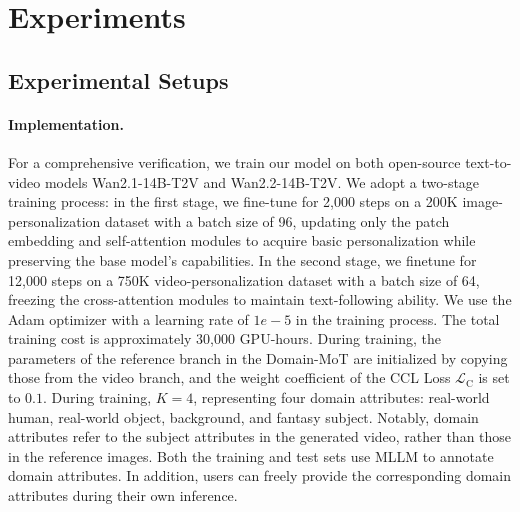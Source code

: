 \section{Experiments}


\subsection{Experimental Setups}
\paragraph{\textbf{Implementation.}}  For a comprehensive verification, we train our model on both open-source text-to-video models Wan2.1-14B-T2V \cite{wan2025wan} and Wan2.2-14B-T2V. We adopt a two-stage training process: in the first stage, we fine-tune for 2,000 steps on a 200K image-personalization dataset with a batch size of 96, updating only the patch embedding and self-attention modules to acquire basic personalization while preserving the base model’s capabilities. In the second stage, we finetune for 12,000 steps on a 750K video-personalization dataset with a batch size of 64, freezing the cross-attention modules to maintain text-following ability.  We use the Adam optimizer with a learning rate of $1e-5$ in the training process. The total training cost is approximately 30,000 GPU-hours. During training, the parameters of the reference branch in the Domain-MoT are initialized by copying those from the video branch, and the weight coefficient of the CCL Loss $\mathcal{L}_{\mathrm{C}}$ is set to $0.1$. During training, $K=4$, representing four domain attributes: real-world human, real-world object, background, and fantasy subject. Notably, domain attributes refer to the subject attributes in the generated video, rather than those in the reference images. Both the training and test sets use MLLM to annotate domain attributes. In addition, users can freely provide the corresponding domain attributes during their own inference.


